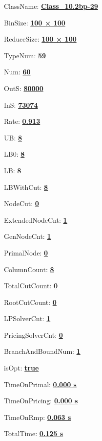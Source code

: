 \documentclass[11pt]{article}
\begin{document}
\pagestyle{empty}


ClassName: \underline{\textbf{Class_10.2bp-29}}
\par
BinSize: \underline{\textbf{100 × 100}}
\par
ReduceSize: \underline{\textbf{100 × 100}}
\par
TypeNum: \underline{\textbf{59}}
\par
Num: \underline{\textbf{60}}
\par
OutS: \underline{\textbf{80000}}
\par
InS: \underline{\textbf{73074}}
\par
Rate: \underline{\textbf{0.913}}
\par
UB: \underline{\textbf{8}}
\par
LB0: \underline{\textbf{8}}
\par
LB: \underline{\textbf{8}}
\par
LBWithCut: \underline{\textbf{8}}
\par
NodeCut: \underline{\textbf{0}}
\par
ExtendedNodeCnt: \underline{\textbf{1}}
\par
GenNodeCnt: \underline{\textbf{1}}
\par
PrimalNode: \underline{\textbf{0}}
\par
ColumnCount: \underline{\textbf{8}}
\par
TotalCutCount: \underline{\textbf{0}}
\par
RootCutCount: \underline{\textbf{0}}
\par
LPSolverCnt: \underline{\textbf{1}}
\par
PricingSolverCnt: \underline{\textbf{0}}
\par
BranchAndBoundNum: \underline{\textbf{1}}
\par
isOpt: \underline{\textbf{true}}
\par
TimeOnPrimal: \underline{\textbf{0.000 s}}
\par
TimeOnPricing: \underline{\textbf{0.000 s}}
\par
TimeOnRmp: \underline{\textbf{0.063 s}}
\par
TotalTime: \underline{\textbf{0.125 s}}
\par
\newpage


\end{document}
